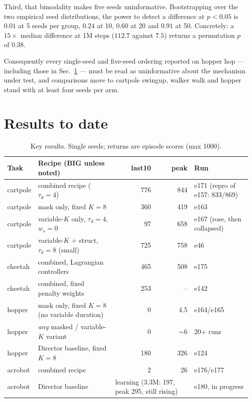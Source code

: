 \documentclass[10pt]{article}
\begin{document}
Third, that bimodality makes five seeds uninformative. Bootstrapping over the
two empirical seed distributions, the power to detect a difference at
$p<0.05$ is $0.01$ at 5 seeds per group, $0.24$ at 10, $0.60$ at 20 and
$0.91$ at 50. Concretely: a $15\times$ median difference at 1M steps
($112.7$ against $7.5$) returns a permutation $p$ of $0.38$.

Consequently every single-seed and five-seed ordering reported on hopper hop
--- including those in Sec.~\ref{sec:results} --- must be read as
uninformative about the mechanism under test, and comparisons move to
cartpole swingup, walker walk and hopper stand with at least four seeds per
arm.

\section{Results to date}
\label{sec:results}

\begin{table}[h]
\centering\small
\begin{tabular}{llrrl}
\toprule
Task & Recipe (BIG unless noted) & last10 & peak & Run \\
\midrule
cartpole & combined recipe ($\tau_d{=}4$) & 776 & 844 & e171 (repro of e157: 833/869) \\
cartpole & mask only, fixed $K{=}8$        & 360 & 419 & e163 \\
cartpole & variable-$K$ only, $\tau_d{=}4$, $w_s{=}0$ &  97 & 658 & e167 (rose, then collapsed) \\
cartpole & variable-$K$ + struct, $\tau_d{=}8$ (small) & 725 & 758 & e46 \\
cheetah  & combined, Lagrangian controllers & 465 & 508 & e175 \\
cheetah  & combined, fixed penalty weights  & 253 & --  & e142 \\
hopper   & mask only, fixed $K{=}8$ (no variable duration) & 0 & 4.5 & e164/e165 \\
hopper   & \emph{any} masked / variable-$K$ variant & 0 & $\sim$6 & 20+ runs \\
hopper   & Director baseline, fixed $K{=}8$ & 180 & 326 & e124 \\
acrobot  & combined recipe & 2 & 26 & e176/e177 \\
acrobot  & Director baseline & \multicolumn{2}{l}{learning (3.3M: 197, peak 295, still rising)} & e180, in progress \\
\bottomrule
\end{tabular}
\caption{Key results. Single seeds; returns are episode scores (max 1000).}
\label{tab:results}
\end{table}
\end{document}
